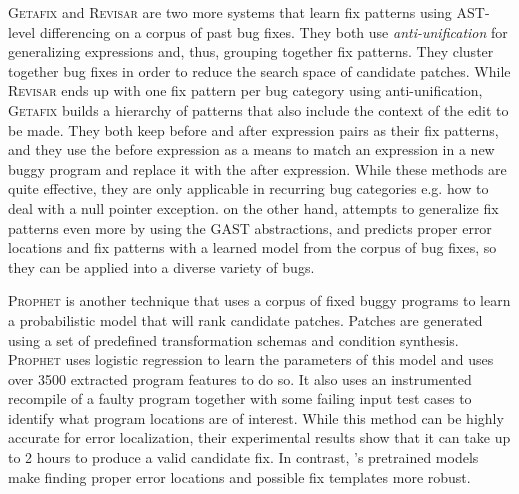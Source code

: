\textsc{Getafix} \citep{Bader_2019} and \textsc{Revisar} \citep{Rolim_2018} are
two more systems that learn fix patterns using AST-level differencing on a
corpus of past bug fixes. They both use \textit{anti-unification}
\citep{Kutsia_2014} for generalizing expressions and, thus, grouping together
fix patterns. They cluster together bug fixes in order to reduce the search
space of candidate patches. While \textsc{Revisar} \citep{Rolim_2018} ends up
with one fix pattern per bug category using anti-unification, \textsc{Getafix}
\citep{Bader_2019} builds a hierarchy of patterns that also include the context
of the edit to be made. They both keep before and after expression pairs as
their fix patterns, and they use the before expression as a means to match an
expression in a new buggy program and replace it with the after expression.
While these methods are quite effective, they are only applicable in recurring
bug categories e.g. how to deal with a null pointer exception. \toolname on the
other hand, attempts to generalize fix patterns even more by using the GAST
abstractions, and predicts proper error locations and fix patterns with a
learned model from the corpus of bug fixes, so they can be applied into a
diverse variety of bugs.

\textsc{Prophet} \citep{Long_2016} is another technique that uses a corpus of
fixed buggy programs to learn a probabilistic model that will rank candidate
patches. Patches are generated using a set of predefined transformation schemas
and condition synthesis. \textsc{Prophet} uses logistic regression to learn the
parameters of this model and uses over 3500 extracted program features to do so.
It also uses an instrumented recompile of a faulty program together with some
failing input test cases to identify what program locations are of interest.
While this method can be highly accurate for error localization, their
experimental results show that it can take up to 2 hours to produce a valid
candidate fix. In contrast, \toolname's pretrained models make finding proper
error locations and possible fix templates more robust.
